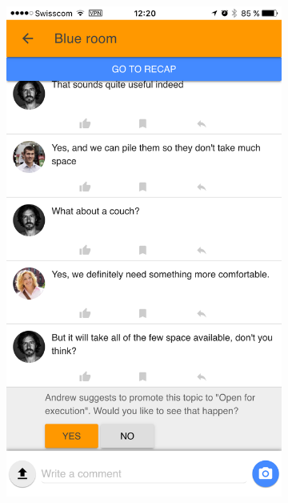 \documentclass[a4paper,12pt,twoside]{article}
\begin{document}
\begin{figure}[!htb]
\begin{subfigure}[t]{.32\textwidth}
        \includegraphics[width=\textwidth]{images/promotionPoll_question.png}
    \end{subfigure}
    \hfill
    \begin{subfigure}[t]{.32\textwidth}

\end{subfigure}
\end{figure}
\end{document}
